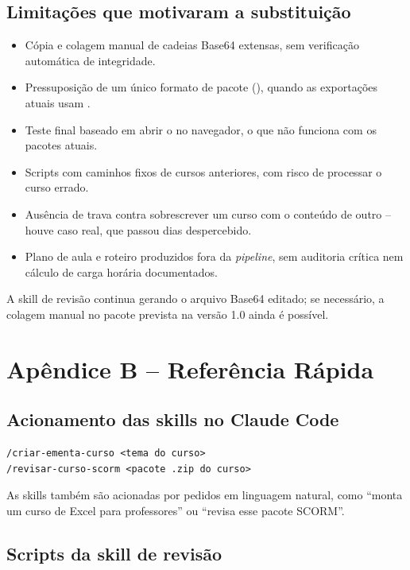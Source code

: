 \documentclass[12pt,a4paper]{article}
\begin{document}
\subsection*{Limitações que motivaram a substituição}

\begin{itemize}[leftmargin=*]
\item Cópia e colagem manual de cadeias Base64 extensas, sem verificação automática de integridade.
\item Pressuposição de um único formato de pacote (), quando as exportações atuais usam .
\item Teste final baseado em abrir o  no navegador, o que não funciona com os pacotes atuais.
\item Scripts com caminhos fixos de cursos anteriores, com risco de processar o curso errado.
\item Ausência de trava contra sobrescrever um curso com o conteúdo de outro -- houve caso real, que passou dias despercebido.
\item Plano de aula e roteiro produzidos fora da \textit{pipeline}, sem auditoria crítica nem cálculo de carga horária documentados.
\end{itemize}

A skill de revisão continua gerando o arquivo Base64 editado; se necessário, a colagem manual no pacote prevista na versão 1.0 ainda é possível.

\clearpage
{}
\section*{Apêndice B -- Referência Rápida}

\subsection*{Acionamento das skills no Claude Code}

\begingroup\small{}
\begin{verbatim}
/criar-ementa-curso <tema do curso>
/revisar-curso-scorm <pacote .zip do curso>
\end{verbatim}
\endgroup

As skills também são acionadas por pedidos em linguagem natural, como ``monta um curso de Excel para professores'' ou ``revisa esse pacote SCORM''.

\subsection*{Scripts da skill de revisão}
\end{document}
